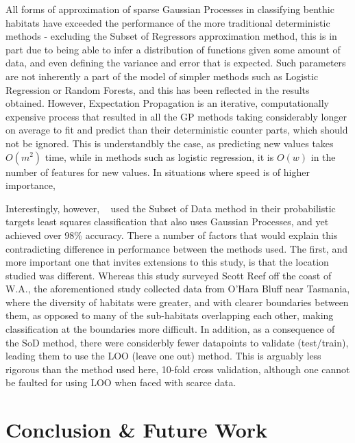 \documentclass[10pt,sts]{article}
\begin{document}
\begin{multicols}{2}
All forms of approximation of sparse Gaussian Processes in classifying benthic habitats have exceeded the performance of the more traditional deterministic methods - excluding the Subset of Regressors approximation method, this is in part due to being able to infer a distribution of functions given some amount of data, and even defining the variance and error that is expected. Such parameters are not inherently a part of the model of simpler methods such as Logistic Regression or Random Forests, and this has been reflected in the results obtained. However, Expectation Propagation is an iterative, computationally expensive process that resulted in all the GP methods taking considerably longer on average to fit and predict than their deterministic counter parts, which should not be ignored. This is understandbly the case, as predicting new values takes $O(m^2)$ time, while in methods such as logistic regression, it is $O(w)$ in the number of features for new values. In situations where speed is of higher importance, 

Interestingly, however, ~\citet{bender12} used the Subset of Data method in their probabilistic targets least squares classification that also uses Gaussian Processes, and yet achieved over 98\% accuracy. There a number of factors that would explain this contradicting difference in performance between the methods used. The first, and more important one that invites extensions to this study, is that the location studied was different. Whereas this study surveyed Scott Reef off the coast of W.A., the aforementioned study collected data from O'Hara Bluff near Tasmania, where the diversity of habitats were greater, and with clearer boundaries between them, as opposed to many of the sub-habitats overlapping each other, making classification at the boundaries more difficult. In addition, as a consequence of the SoD method, there were considerbly fewer datapoints to validate (test/train), leading them to use the LOO (leave one out) method. This is arguably less rigorous than the method used here, 10-fold cross validation, although one cannot be faulted for using LOO when faced with scarce data.

\section{Conclusion \& Future Work}


\end{multicols}
\end{document}
